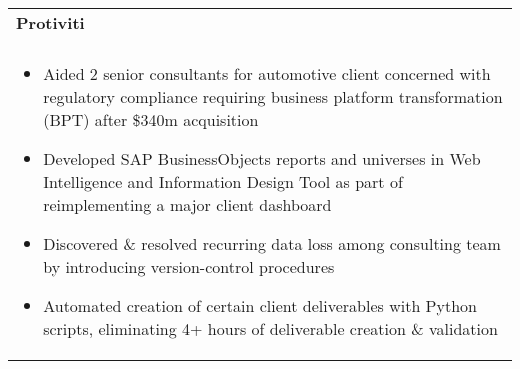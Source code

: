 \documentclass[letterpaper,10pt]{article} %
\begin{document}
\begin{tabular*}{\linewidth}{@{\extracolsep{\fill}} lr }
\textbf{Protiviti} & \scriptsize\bfseries\color{sectioncolour}{Boston, MA}\\
\footnotesize\bfseries\color{sectioncolour}{Technology Consulting Intern} & \scriptsize\bfseries\color{sectioncolour}{May 2024 - August 2024}\\
\multicolumn{2}{p{\linewidth}}{
    \scriptsize{\vspace{-0.1in}\begin{itemize}
        \item Aided 2 senior consultants for automotive client concerned with regulatory compliance requiring business platform transformation (BPT) after \$340m acquisition
        \item Developed SAP BusinessObjects reports and universes in Web Intelligence and Information Design Tool as part of reimplementing a major client dashboard
        \item Discovered \& resolved recurring data loss among consulting team by introducing version-control procedures
        \item Automated creation of certain client deliverables with Python scripts, eliminating 4+ hours of deliverable creation \& validation
    \end{itemize}\vspace{-0.0in}}
}\\


\end{tabular*}
\end{document}
